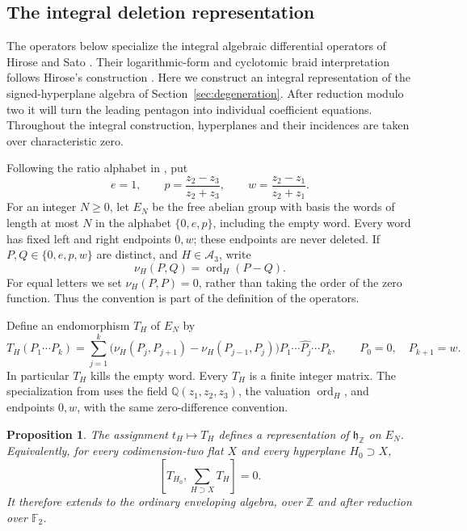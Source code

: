 \documentclass[11pt]{article}
\newcommand{\Q}{\mathbb Q}
\newcommand{\Z}{\mathbb Z}
\newcommand{\F}{{\mathbb F_2}}
\newtheorem{proposition}[theorem]{Proposition}
\theoremstyle{definition}
\theoremstyle{remark}
\numberwithin{equation}{section}
\begin{document}
\subsection{The integral deletion representation}
The operators below specialize the integral algebraic differential
operators of Hirose and Sato \cite[Section~2]{HiroseSato}.
Their logarithmic-form and cyclotomic braid interpretation follows
Hirose's construction \cite[Section~4.3]{Hirose}.
Here we construct an integral representation of the signed-hyperplane
algebra of Section~\ref{sec:degeneration}.  After reduction modulo two it
will turn the leading pentagon into individual coefficient equations.
Throughout the integral construction, hyperplanes and their incidences
are taken over characteristic zero.

Following the ratio alphabet in \cite[Section~6]{Hirose}, put
\begin{equation}\label{eq:deletion-letters}
 e=1,\qquad
 p=\frac{z_2-z_3}{z_2+z_3},\qquad
 w=\frac{z_2-z_1}{z_2+z_1}.
\end{equation}
For an integer $N\geq0$, let $E_N$ be the free abelian group with basis the
words of length at most $N$ in the alphabet $\{0,e,p\}$, including the
empty word.  Every word has fixed left and right endpoints $0,w$; these
endpoints are never deleted.  If $P,Q\in\{0,e,p,w\}$ are distinct, and
$H\in\mathcal A_3$, write
\[
 \nu_H(P,Q)=\operatorname{ord}_H(P-Q).
\]
For equal letters we set $\nu_H(P,P)=0$, rather than taking the order of
the zero function.  Thus the convention is part of the definition of
the operators.

Define an endomorphism $T_H$ of $E_N$ by
\begin{equation}\label{eq:deletion-operator}
 T_H(P_1\cdots P_k)
 =\sum_{j=1}^{k}
 \bigl(\nu_H(P_j,P_{j+1})-\nu_H(P_{j-1},P_j)\bigr)
 P_1\cdots\widehat{P_j}\cdots P_k,
 \qquad P_0=0,\quad P_{k+1}=w.
\end{equation}
In particular $T_H$ kills the empty word.  Every $T_H$ is a finite
integer matrix.  The specialization from \cite[Section~2]{HiroseSato}
uses the field $\Q(z_1,z_2,z_3)$, the valuation $\operatorname{ord}_H$,
and endpoints $0,w$, with the same zero-difference convention.

\begin{proposition}\label{prop:deletion-representation}
The assignment $t_H\mapsto T_H$ defines a representation of
$\mathfrak h_{\Z}$ on $E_N$.  Equivalently, for every codimension-two
flat $X$ and every hyperplane $H_0\supset X$,
\begin{equation}\label{eq:deletion-flat}
 \left[T_{H_0},\sum_{H\supset X}T_H\right]=0.
\end{equation}
It therefore extends to the ordinary enveloping algebra, over $\Z$ and
after reduction over $\F$.
\end{proposition}
\end{document}
